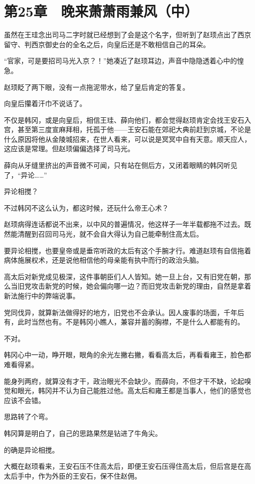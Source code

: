 \section{第25章　晚来萧萧雨兼风（中）}

虽然在王珪念出司马二字时就已经想到了会是这个名字，但听到了赵顼点出了西京留守、判西京御史台的全名之后，向皇后还是不敢相信自己的耳朵。

“官家，可是要招司马光入京？！”她凑近了赵顼耳边，声音中隐隐透着心中的惶急。

赵顼眨了两下眼，没有一点拖泥带水，给了皇后肯定的答复。

向皇后攥着汗巾不说话了。

不仅是韩冈，或是向皇后，相信王珪、薛向他们，都会觉得赵顼肯定会找王安石入宫，甚至第三度宣麻拜相，托孤于他——王安石能在郊祀大典前赶到京城，不论是什么原因将他从金陵城招来，在世人看来，可以说是冥冥中自有天意。顺天应人，这应该是常理。但赵顼偏偏选择了司马光。

薛向从牙缝里挤出的声音微不可闻，只有站在侧后方，又闭着眼睛的韩冈听见了，“异论……”

异论相搅？

不过韩冈不这么认为，都这时候，还玩什么帝王心术？

赵顼病得连话都说不出来，以中风的普遍情况，他这样子一年半载都拖不过去。既然能清醒到召回司马光，就不会自大得认为自己能牵制住高太后。

要异论相搅，也要皇帝或是垂帘听政的太后有这个手腕才行。难道赵顼有自信拖着病体施展权术，还是说他相信他的母亲能有执中而行的政治头脑。

高太后对新党成见极深，这件事朝臣们人人皆知。她一旦上台，又有旧党在朝，那么当旧党攻击新党的时候，她会偏向哪一边？而旧党攻击新党的理由，自然是拿着新法施行中的弊端说事。

党同伐异，就算新法做得好的地方，旧党也不会承认。因人废事的场面，千年后有，此时当然也有。不是韩冈小瞧人，兼容并蓄的胸襟，不是什么人都能有的。

不对。

韩冈心中一动，睁开眼，眼角的余光左撇右撇，看看高太后，再看看雍王，脸色都难看得紧。

能身列两府，就算没有才干，政治眼光不会缺少。而薛向，不但才干不缺，论起嗅觉和眼光，韩冈并不认为自己能胜过他。高太后和雍王都是当事人，他们的感觉也应该不会错。

思路转了个弯。

韩冈算是明白了，自己的思路果然是钻进了牛角尖。

的确是异论相搅。

大概在赵顼看来，王安石压不住高太后，即便王安石压得住高太后，但后宫是在高太后手中，作为外臣的王安石，保不住赵佣。

